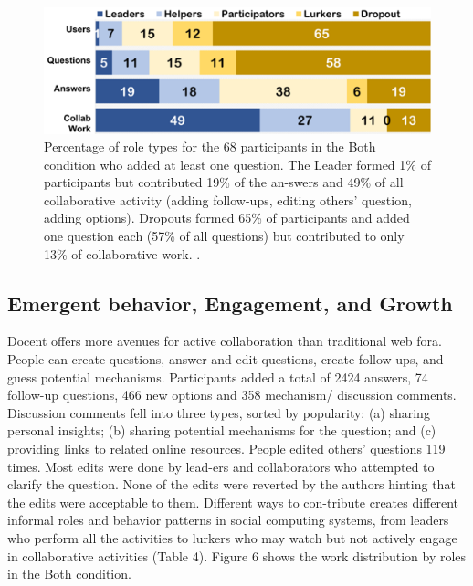 \begin{figure}[h] 
  \centering
  \includegraphics[width=1.0\textwidth]{figures/docent/fig-6.png}
  \caption[]
{Percentage of role types for the 68 participants in the Both condition who added at least one question. The Leader formed 1\% of participants but contributed 19\% of the an-swers and 49\% of all collaborative activity (adding follow-ups, editing others’ question, adding options). Dropouts formed 65\% of participants and added one question each (57\% of all questions) but contributed to only 13\% of collaborative work. .}
  \label{fig:docent-6}
\end{figure}

\subsection{Emergent behavior, Engagement, and Growth}
Docent offers more avenues for active collaboration than traditional web fora. People can create questions, answer and edit questions, create follow-ups, and guess potential mechanisms. Participants added a total of 2424 answers, 74 follow-up questions, 466 new options and 358 mechanism/ discussion comments. Discussion comments fell into three types, sorted by popularity: (a) sharing personal insights; (b) sharing potential mechanisms for the question; and (c) providing links to related online resources. People edited others’ questions 119 times. Most edits were done by lead-ers and collaborators who attempted to clarify the question. None of the edits were reverted by the authors hinting that the edits were acceptable to them. Different ways to con-tribute creates different informal roles and behavior patterns in social computing systems, from leaders who perform all the activities to lurkers who may watch but not actively engage in collaborative activities (Table 4). Figure 6 shows the work distribution by roles in the Both condition.


